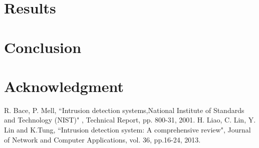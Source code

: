 \documentclass[conference]{IEEEtran}
\begin{document}
\section{Results}

\section{Conclusion}

\section*{Acknowledgment}

\begin{thebibliography}{00}
 R. Bace, P. Mell, ``Intrusion detection systems,National Institute of Standards and
Technology (NIST)" , Technical Report, pp. 800-31, 2001.
 H. Liao, C. Lin, Y. Lin and K.Tung, ``Intrusion detection system: A comprehensive review", Journal of Network and Computer Applications, vol. 36, pp.16-24, 2013.
\end{thebibliography}
\end{document}
